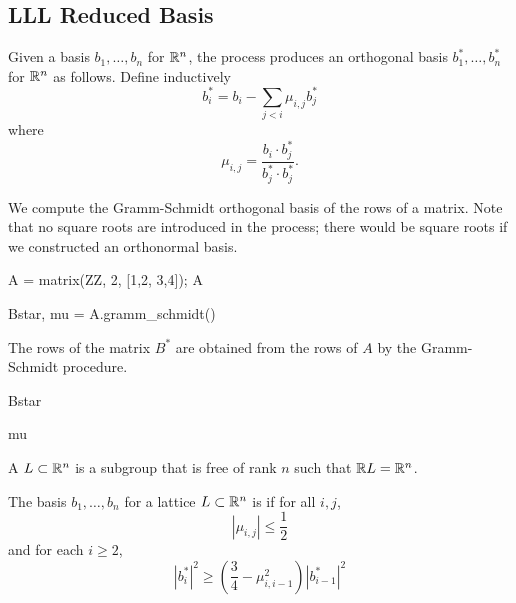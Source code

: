 \subsection{LLL Reduced Basis}
Given a basis $b_1,\ldots, b_n$ for $\mathbb{R}^n$, the  process produces an orthogonal basis 
$b_1^*,\ldots, b_n^*$ for $\mathbb{R}^n$ as follows.  Define inductively
$$
   b_i^* = b_i - \sum_{j < i} \mu_{i,j} b_j^*
$$
where
$$
\mu_{i,j} = \frac{b_i \cdot b_j^*}{b_j^* \cdot b_j^*}.
$$

\begin{example}
We compute the Gramm-Schmidt orthogonal basis of the rows
of a matrix.  Note that no square roots are introduced
in the process; there would be square roots if we
constructed an orthonormal basis. 
\begin{sagecode}
\begin{sagecell}
A = matrix(ZZ, 2, [1,2, 3,4]); A
\end{sagecell}
\begin{sageout}
[1 2]
[3 4]
\end{sageout}
\begin{sagecell}
Bstar, mu = A.gramm_schmidt()
\end{sagecell}
\end{sagecode}

\noindent{}The rows of the matrix $B^*$ are obtained
from the rows of $A$ by the Gramm-Schmidt procedure. 
\begin{sagecode}
\begin{sagecell}
Bstar
\end{sagecell}
\begin{sageout}
[   1    2]
[ 4/5 -2/5]
\end{sageout}
\begin{sagecell}
mu
\end{sagecell}
\begin{sageout}
[   0    0]
[11/5    0]
\end{sageout}
\end{sagecode}
\end{example}

A  $L\subset \mathbb{R}^n$ is a subgroup that
is free of rank $n$ such that $\mathbb{R} L = \mathbb{R}^n$. 

\begin{definition}
The basis $b_1,\ldots, b_n$ for a lattice $L\subset \mathbb{R}^n$
is  if for all $i,j$, 
$$
   |\mu_{i,j}| \leq \frac{1}{2}
$$   
and for each $i\geq 2$, 
$$
  |b_i^*|^2 \geq \left( \frac{3}{4} - \mu_{i,i-1}^2\right) | b_{i-1}^*|^2
$$

\end{definition}

